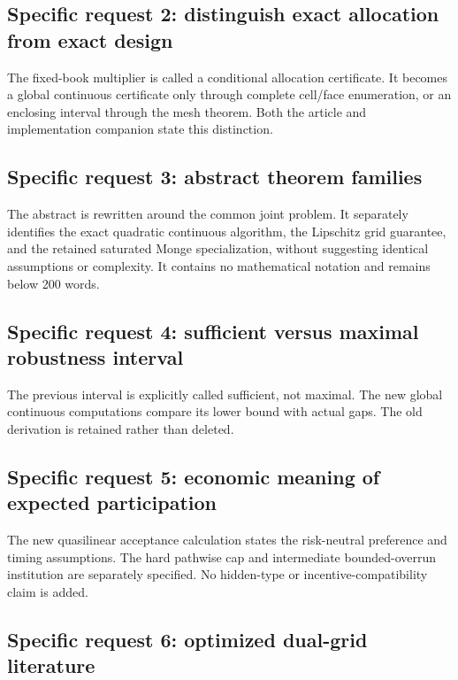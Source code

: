 \documentclass[11pt,letterpaper]{article}
\begin{document}
\subsection*{Specific request 2: distinguish exact allocation from exact design}


The fixed-book multiplier is called a conditional allocation certificate. It becomes a global continuous certificate only through complete cell/face enumeration, or an enclosing interval through the mesh theorem. Both the article and implementation companion state this distinction.



\subsection*{Specific request 3: abstract theorem families}


The abstract is rewritten around the common joint problem. It separately identifies the exact quadratic continuous algorithm, the Lipschitz grid guarantee, and the retained saturated Monge specialization, without suggesting identical assumptions or complexity. It contains no mathematical notation and remains below 200 words.



\subsection*{Specific request 4: sufficient versus maximal robustness interval}


The previous interval is explicitly called sufficient, not maximal. The new global continuous computations compare its lower bound with actual gaps. The old derivation is retained rather than deleted.



\subsection*{Specific request 5: economic meaning of expected participation}


The new quasilinear acceptance calculation states the risk-neutral preference and timing assumptions. The hard pathwise cap and intermediate bounded-overrun institution are separately specified. No hidden-type or incentive-compatibility claim is added.



\subsection*{Specific request 6: optimized dual-grid literature}
\end{document}
